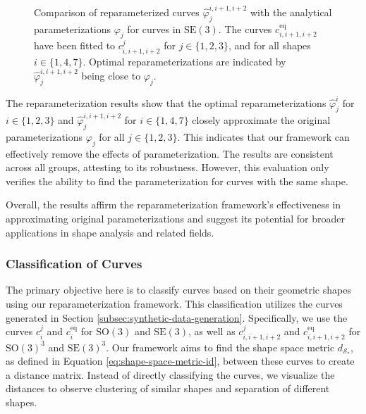 \begin{figure}
    \caption[Reparameterization of curves in \(\mathrm{SE}(3)^3\)]{Comparison of reparameterized curves \(\hat{\varphi}_j^{i,i+1,i+2}\) with the analytical parameterizations \(\varphi_j\) for curves in \(\mathrm{SE}(3)\). The curves \(c_{i,i+1,i+2}^{\text{eq}}\) have been fitted to \(c_{i,i+1,i+2}^j\) for \(j \in \{1, 2, 3\}\), and for all shapes \(i \in \{1, 4, 7\}\). Optimal reparameterizations are indicated by \(\hat{\varphi}_j^{i,i+1,i+2}\) being close to \(\varphi_j\).}
    \label{fig:reparameterization-SE3-3}
\end{figure}

The reparameterization results show that the optimal reparameterizations \(\hat{\varphi}_j^i\) for \(i \in \{1, 2, 3\}\) and \(\hat{\varphi}_j^{i,i+1,i+2}\) for \(i \in \{1, 4, 7\}\) closely approximate the original parameterizations \(\varphi_j\) for all \(j \in \{1, 2, 3\}\). This indicates that our framework can effectively remove the effects of parameterization. The results are consistent across all groups, attesting to its robustness. However, this evaluation only verifies the ability to find the parameterization for curves with the same shape. 

Overall, the results affirm the reparameterization framework's effectiveness in approximating original parameterizations and suggest its potential for broader applications in shape analysis and related fields.

\FloatBarrier
\subsubsection{Classification of Curves}
\label{subsec:classification-curves}

The primary objective here is to classify curves based on their geometric shapes using our reparameterization framework. This classification utilizes the curves generated in Section \ref{subsec:synthetic-data-generation}. Specifically, we use the curves \(c_i^j\) and \(c_i^{\text{eq}}\) for \(\mathrm{SO}(3)\) and \(\mathrm{SE}(3)\), as well as \(c_{i,i+1,i+2}^j\) and \(c_{i,i+1,i+2}^{\text{eq}}\) for \(\mathrm{SO}(3)^3\) and \(\mathrm{SE}(3)^3\). Our framework aims to find the shape space metric \(d_{\mathcal{S}_*}\), as defined in Equation \eqref{eq:shape-space-metric-id}, between these curves to create a distance matrix. Instead of directly classifying the curves, we visualize the distances to observe clustering of similar shapes and separation of different shapes.

